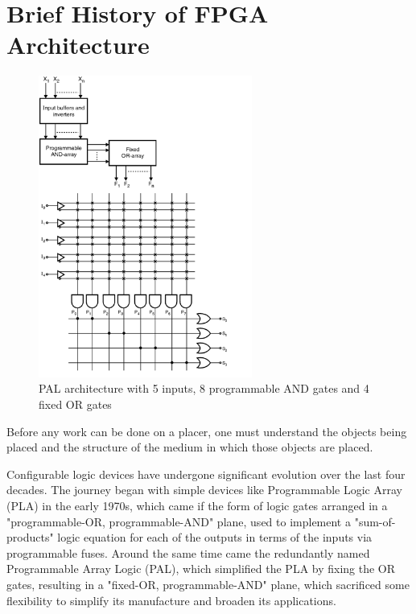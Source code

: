 \documentclass[twocolumn]{article}
\begin{document}
\section{Brief History of FPGA Architecture}
    \begin{figure}
        \centering
        \includegraphics[width=7.0cm]{figures/pal_2.png}
        \caption{PAL architecture with 5 inputs, 8 programmable AND gates and 4 fixed OR gates}
        \label{fig:pla}
    \end{figure}

    Before any work can be done on a placer, one must understand the objects being placed and the structure of the medium in which those objects are placed. 

    Configurable logic devices have undergone significant evolution over the last four decades.
    The journey began with simple devices like Programmable Logic Array (PLA) in the early 1970s, which came if the form of logic gates arranged in a "programmable-OR, programmable-AND" plane, used to implement a "sum-of-products" logic equation for each of the outputs in terms of the inputs via programmable fuses. 
    Around the same time came the redundantly named Programmable Array Logic (PAL), which simplified the PLA by fixing the OR gates, resulting in a "fixed-OR, programmable-AND" plane, which sacrificed some flexibility to simplify its manufacture and broaden its applications.
\end{document}
